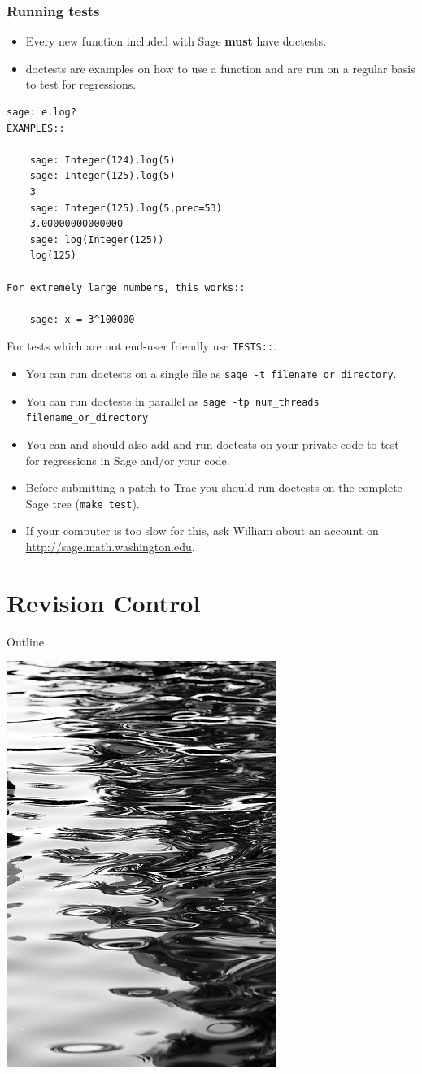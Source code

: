 \documentclass[11pt,blackandwhite]{beamer}
\renewcommand{\emph}[1]{{\color{black}\bf #1}}
\newcommand{\code}{\lstinline}
\begin{document}
\begin{frame}
\frametitle{Running tests}
\begin{itemize}
 \item Every new function included with Sage \emph{must} have doctests.
 \item doctests are examples on how to use a function and are run on a regular
basis to test for regressions.
\end{itemize}
\begin{tiny}
\begin{lstlisting}
sage: e.log?
EXAMPLES::

    sage: Integer(124).log(5)
    sage: Integer(125).log(5)
    3
    sage: Integer(125).log(5,prec=53)
    3.00000000000000
    sage: log(Integer(125))
    log(125)

For extremely large numbers, this works::

    sage: x = 3^100000
\end{lstlisting}
\end{tiny}
For tests which are not end-user friendly use \code{TESTS::}.

\framebreak

\begin{itemize}
 \item You can run doctests on a single file as 
\code{sage -t filename_or_directory}.
 \item You can run doctests in parallel as 
\code{sage -tp num_threads filename_or_directory}
 \item You can and should also add and run doctests on your private code to
test for regressions in Sage and/or your code.
 \item Before submitting a patch to Trac you should run doctests on the
complete Sage tree (\code{make test}).
 \item If your computer is too slow for this, ask William about an account on
\url{http://sage.math.washington.edu}.
\end{itemize}
\end{frame}

\section{Revision Control}
\begin{frame}{Outline}
\tableofcontents[sectionstyle=show/shaded]
\begin{flushright}
\includegraphics[height=0.3\textwidth]{mercurial.png}
\end{flushright}
\end{frame}
\end{document}
